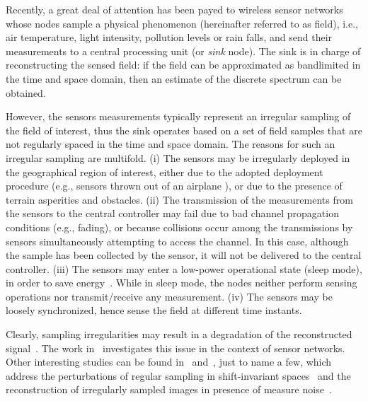 \documentclass[11pt, draftcls, onecolumn, a4paper]{IEEEtran}
\begin{document}
Recently, a great deal of attention has been payed to wireless sensor
networks whose nodes sample a physical phenomenon (hereinafter
referred to as field), i.e., air temperature, light intensity, 
pollution levels or rain falls, and send their measurements to a 
central processing unit
(or {\em sink} node).  The sink is in charge of reconstructing the
sensed field: if the field can be approximated as bandlimited in the
time and space domain, then an estimate of the discrete spectrum can
be obtained.

However, the sensors measurements typically represent an irregular
sampling of the field of interest, thus the sink operates based on a
set of field samples that are not regularly spaced in the time and
space domain.  The reasons for such an irregular sampling are multifold.  
(i) The sensors may be
irregularly deployed in the geographical region of interest, either due
to the adopted deployment procedure (e.g., sensors thrown out of an
airplane \cite{smartdust}), or due to the presence of terrain
asperities and obstacles.  (ii) The transmission of the measurements
from the sensors to the central controller may fail due to bad channel
propagation conditions (e.g., fading), or because collisions occur among the
transmissions by sensors simultaneously attempting to access the channel. 
In this case, although the sample has been collected
by the sensor, it will not be delivered to the central controller.
(iii) The sensors may enter a low-power operational state (sleep
mode), in order to save energy~\cite{Perillo04,Willett04}.  While in
sleep mode, the nodes neither perform sensing operations nor
transmit/receive any measurement.  (iv) The sensors may be loosely
synchronized, hence sense the field at different time instants.

Clearly, sampling irregularities may result in a degradation of the
reconstructed signal~\cite{Marvasti}.  The work in~\cite{Ganesan03}
investigates this issue in the context of sensor networks. Other
interesting studies can be found in~\cite{Zhao} and~\cite{Early}, just
to name a few, which address the perturbations of regular sampling in
shift-invariant spaces~\cite{Zhao} and the reconstruction of
irregularly sampled images in presence of measure noise~\cite{Early}.
\end{document}
